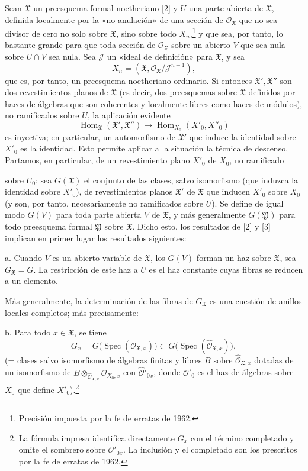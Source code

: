 \documentclass[11pt,twoside,openany]{book}
\numberwithin{equation}{section}
\newcommand{\src}[1]{%
  \phantomsection\hypertarget{src:#1}{}%
  \marginpar{\raggedleft\footnotesize\sffamily #1}%
}
\theoremstyle{plain}
\theoremstyle{definition}
\theoremstyle{remark}
\newcommand{\FgaUnitKey}{frontmatter}
\renewcommand{\src}[1]{%
  \phantomsection\hypertarget{src:\FgaUnitKey:#1}{}%
  \marginpar{\raggedleft\footnotesize\sffamily #1}%
}
\theoremstyle{plain}
\theoremstyle{definition}
\theoremstyle{remark}
\begin{document}
Sean $\mathfrak X$ un preesquema formal noetheriano [2] y $U$ una parte
abierta de $\mathfrak X$, definida localmente por la «no anulación» de una
sección de $\mathcal O_{\mathfrak X}$ que no sea divisor de cero no solo sobre
$\mathfrak X$, sino sobre todo $X_n$,\footnote{Precisión impuesta por la fe de
erratas de 1962.} y que sea, por tanto, lo bastante grande para que toda sección
de $\mathcal O_{\mathfrak X}$ sobre un abierto $V$ que sea nula sobre $U\cap V$
sea nula. Sea $\mathcal J$ un «ideal de definición» para $\mathfrak X$, y sea
\[
  X_n=(\mathfrak X,\mathcal O_{\mathfrak X}/\mathcal J^{n+1}),
\]
que es, por tanto, un preesquema noetheriano ordinario. Si entonces
$\mathfrak X',\mathfrak X''$ son dos revestimientos planos de $\mathfrak X$ (es
decir, dos preesquemas sobre $\mathfrak X$ definidos por haces de álgebras que
son coherentes y localmente libres como haces de módulos), no ramificados sobre
$U$, la aplicación evidente
\[
  \operatorname{Hom}_{\mathfrak X}(\mathfrak X',\mathfrak X'')
  \longrightarrow
  \operatorname{Hom}_{X_0}(X'_0,X''_0)
\]
es inyectiva; en particular, un automorfismo de $\mathfrak X'$ que induce la
identidad sobre $X'_0$ es la identidad. Esto permite aplicar a la situación la
técnica de descenso. Partamos, en particular, de un revestimiento plano $X'_0$
de $X_0$, no ramificado

\src{388}
sobre $U_0$; sea $G(\mathfrak X)$ el conjunto de las clases, salvo isomorfismo
(que induzca la identidad sobre $X'_0$), de revestimientos planos $\mathfrak X'$
de $\mathfrak X$ que inducen $X'_0$ sobre $X_0$ (y son, por tanto,
necesariamente no ramificados sobre $U$). Se define de igual modo $G(V)$ para
toda parte abierta $V$ de $\mathfrak X$, y más generalmente $G(\mathfrak Y)$
para todo preesquema formal $\mathfrak Y$ sobre $\mathfrak X$. Dicho esto, los
resultados de [2] y [3] implican en primer lugar los resultados siguientes:

\noindent a. Cuando $V$ es un abierto variable de $\mathfrak X$, los $G(V)$
forman un haz sobre $\mathfrak X$, sea $G_{\mathfrak X}=G$. La restricción de
este haz a $U$ es el haz constante cuyas fibras se reducen a un elemento.

Más generalmente, la determinación de las fibras de $G_{\mathfrak X}$ es una
cuestión de anillos locales completos; más precisamente:

\noindent b. Para todo $x\in\mathfrak X$, se tiene
\[
  G_x=G\bigl(\operatorname{Spec}(\mathcal O_{\mathfrak X,x})\bigr)
  \subset
  G\bigl(\operatorname{Spec}(\widehat{\mathcal O}_{\mathfrak X,x})\bigr),
\]
(= clases salvo isomorfismo de álgebras finitas y libres $B$ sobre
$\widehat{\mathcal O}_{\mathfrak X,x}$ dotadas de un isomorfismo de
$B\otimes_{\widehat{\mathcal O}_{\mathfrak X,x}}\mathcal O_{X_0,x}$ con
$\widehat{\mathcal O}'_{0x}$, donde $\mathcal O'_0$ es el haz de álgebras sobre
$X_0$ que define $X'_0$).\footnote{La fórmula impresa identifica directamente
$G_x$ con el término completado y omite el sombrero sobre
$\mathcal O'_{0x}$. La inclusión y el completado son los prescritos por la fe
de erratas de 1962.}
\end{document}
